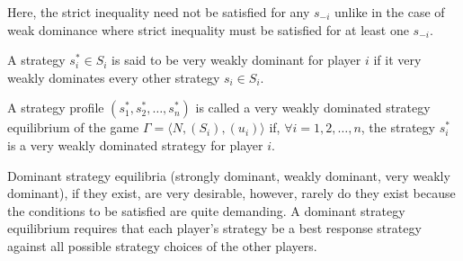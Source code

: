 Here, the strict inequality need not be satisfied for any $s_{-i}$ unlike in the case of weak dominance where strict inequality must be satisfied for at least one $s_{-i}$.
\begin{defn}
    A strategy $s^*_i \in S_i$ is said to be very weakly dominant for player $i$ if it very weakly dominates every other strategy $s_i \in S_i$.
\end{defn}
\begin{defn}
    A strategy profile $(s_1^*,s_2^*,\ldots,s_n^*)$ is called a very weakly dominated strategy equilibrium of the game $\Gamma = \langle N,(S_i),(u_i)\rangle$ if, $\forall i=1,2,\ldots,n$, the strategy $s_i^*$ is a very weakly dominated strategy for player $i$.
\end{defn}
\begin{table}[H]
\centering
    \vLine
    \caption{Payoff Matrix for Modified Prisoner's Dilemma}
\end{table}
Dominant strategy equilibria (strongly dominant, weakly dominant, very weakly dominant), if they exist, are very desirable, however, rarely do they exist because the conditions to be satisfied are quite demanding.
A dominant strategy equilibrium requires that each player’s strategy be a best response strategy against all possible strategy choices of the other players.